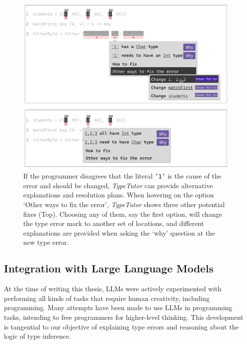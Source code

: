 \begin{figure}[hbt]
  \includegraphics[width=\linewidth]{WhatIf}
  \caption{
      \label{fig:what-if}
      If the programmer disagrees that the literal \texttt{'1'} is the cause of the error and should be changed, \textit{TypeTutor} can provide alternative explanations and resolution plans. When hovering on the option `Other ways to fix the error', \textit{TypeTutor} shows three other potential fixes (Top). Choosing any of them, say the first option, will change the type error mark to another set of locations, and different explanations are provided when asking the `why' question at the new type error.
    }
\end{figure}


\subsection{Integration with Large Language Models}
At the time of writing this thesis, LLMs were actively experimented with performing all kinds of tasks that require human creativity, including programming. Many attempts have been made to use LLMs in programming tasks, intending to free programmers for higher-level thinking. This development is tangential to our objective of explaining type errors and reasoning about the logic of type inference. 

